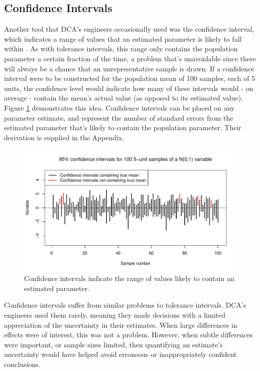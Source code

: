 \documentclass[11pt,a4paper,article]{memoir} %
\begin{document}
\subsection*{Confidence Intervals}
Another tool that DCA's engineers occasionally used was the confidence interval, which indicates a range of values that an estimated parameter is likely to fall within \cite{hastie2013elements}. As with tolerance intervals, this range only contains the population parameter a certain fraction of the time, a problem that's unavoidable since there will always be a chance that an unrepresentative sample is drawn. If a confidence interval were to be constructed for the population mean of 100 samples, each of 5 units, the confidence level would indicate how many of these intervals would - on average - contain the mean's actual value (as opposed to its estimated value). Figure \ref{fig:confidence_intervals} demonstrates this idea. Confidence intervals can be placed on any parameter estimate, and represent the number of standard errors from the estimated parameter that's likely to contain the population parameter. Their derivation is supplied in the Appendix.

\begin{figure}[H]
\includegraphics[width=\textwidth]{confidence_intervals.pdf}
\caption{Confidence intervals indicate the range of values likely to contain an estimated parameter.}
\label{fig:confidence_intervals}
\end{figure}
Confidence intervals suffer from similar problems to tolerance intervals. DCA's engineers used them rarely, meaning they made decisions with a limited appreciation of the uncertainty in their estimates. When large differences in effects were of interest, this was not a problem. However, when subtle differences were important, or sample sizes limited, then quantifying an estimate's uncertainty would have helped avoid erroneous or inappropriately confident conclusions.
\end{document}
